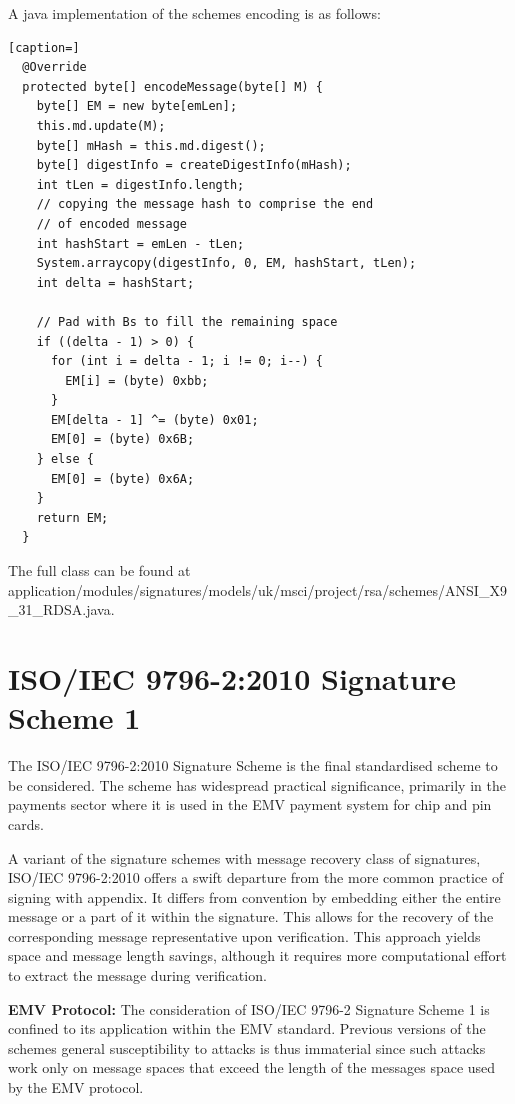 \documentclass[]{final_report}
\theoremstyle{definition}
\begin{document}
A java implementation of the schemes encoding is as follows: 
\begin{lstlisting}[caption=]
  @Override
  protected byte[] encodeMessage(byte[] M) {
    byte[] EM = new byte[emLen];
    this.md.update(M);
    byte[] mHash = this.md.digest();
    byte[] digestInfo = createDigestInfo(mHash);
    int tLen = digestInfo.length;
    // copying the message hash to comprise the end
    // of encoded message
    int hashStart = emLen - tLen;
    System.arraycopy(digestInfo, 0, EM, hashStart, tLen);
    int delta = hashStart;

    // Pad with Bs to fill the remaining space
    if ((delta - 1) > 0) {
      for (int i = delta - 1; i != 0; i--) {
        EM[i] = (byte) 0xbb;
      }
      EM[delta - 1] ^= (byte) 0x01;
      EM[0] = (byte) 0x6B;
    } else {
      EM[0] = (byte) 0x6A;
    }
    return EM;
  }
\end{lstlisting}
The full class can be found at application/modules/signatures/models/uk/msci/project/rsa/schemes/ANSI\_X9\_31\_RDSA.java.

\section{ISO/IEC 9796-2:2010 Signature Scheme 1}
The ISO/IEC 9796-2:2010 \cite{ISO/2010/9796-2-2010} Signature Scheme is the final standardised scheme to be considered. The scheme has widespread practical significance, primarily in the payments sector where it is used in the EMV payment system for chip and pin cards. 

A variant of the signature schemes with message recovery class of signatures, ISO/IEC 9796-2:2010 offers a swift departure from the more common practice of signing with appendix. It differs from convention by embedding either the entire message or a part of it within the signature. This allows for the recovery of the corresponding message representative upon verification. This approach yields space and message length savings, although it requires more computational effort to extract the message during verification.

\textbf{EMV Protocol:} The consideration of ISO/IEC 9796-2 Signature Scheme 1 is confined to its application within the EMV standard. Previous versions of the schemes general susceptibility to attacks \cite{10.1007/3-540-48405-1_1, coron2016practical} is thus immaterial since such attacks work only on message spaces that exceed the length of the messages space used by the EMV protocol.
\end{document}
